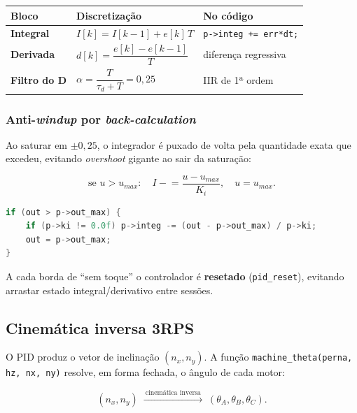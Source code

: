 \documentclass[11pt,a4paper,oneside]{article}
\newcommand{\rowstyle}{\rowcolor{rowgray}}
\begin{document}
\begin{center}
\small
\renewcommand{\arraystretch}{1.4}
\begin{tabularx}{\textwidth}{>{\bfseries}l >{\centering\arraybackslash}p{6.2cm} >{\RaggedRight\arraybackslash}X}
\toprule
Bloco & \normalfont\bfseries Discretização & \normalfont\bfseries No código \\
\midrule
Integral & $I[k] = I[k-1] + e[k]\,T$ & \texttt{p->integ += err*dt;} \\
\rowstyle Derivada & $d[k] = \dfrac{e[k]-e[k-1]}{T}$ & diferença regressiva \\
Filtro do D & $\alpha = \dfrac{T}{\tau_d+T} = 0{,}25$ & IIR de 1ª ordem \\
\bottomrule
\end{tabularx}
\end{center}

\subsubsection{Anti-\emph{windup} por \emph{back-calculation}}

Ao saturar em $\pm0{,}25$, o integrador é puxado de volta pela quantidade exata
que excedeu, evitando \emph{overshoot} gigante ao sair da saturação:

\begin{equation}
  \text{se } u>u_{max}:\quad I \mathrel{-}= \frac{u-u_{max}}{K_i},\quad u=u_{max}.
\end{equation}

\begin{lstlisting}[language=C,caption={Trecho real de \texttt{main/pid.c} — anti-windup.}]
if (out > p->out_max) {
    if (p->ki != 0.0f) p->integ -= (out - p->out_max) / p->ki;
    out = p->out_max;
}
\end{lstlisting}

A cada borda de ``sem toque'' o controlador é \textbf{resetado}
(\texttt{pid\_reset}), evitando arrastar estado integral/derivativo entre
sessões.

\subsection{Cinemática inversa 3RPS}

O PID produz o vetor de inclinação $(n_x,n_y)$. A função
\texttt{machine\_theta(perna, hz, nx, ny)} resolve, em forma fechada, o ângulo de
cada motor:

\begin{equation}
  (n_x, n_y) \;\xrightarrow{\ \text{cinemática inversa}\ }\; (\theta_A, \theta_B, \theta_C).
\end{equation}
\end{document}
